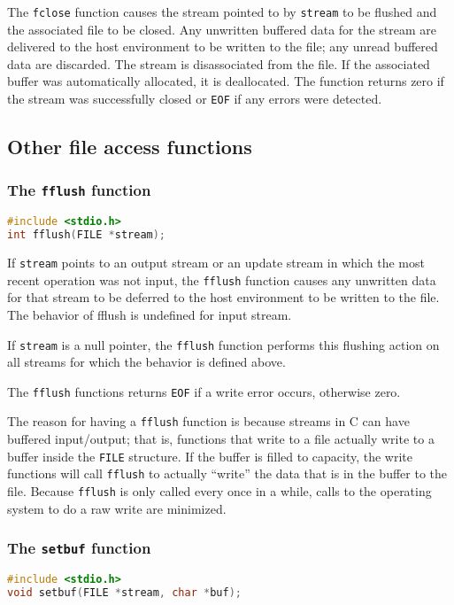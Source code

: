 The \texttt{fclose} function causes the stream pointed to by \texttt{stream} to
be flushed and the associated file to be closed. Any unwritten buffered data
for the stream are delivered to the host environment to be written to the file;
any unread buffered data are discarded. The stream is disassociated from the
file. If the associated buffer was automatically allocated, it is deallocated.
The function returns zero if the stream was successfully closed or \texttt{EOF}
if any errors were detected.

\subsection{Other file access functions}
\subsubsection{The \texttt{fflush} function}
\lstset{basicstyle=\scriptsize, numbers=left, captionpos=b, tabsize=4}
\begin{lstlisting}[caption=Section \thesection listing \arabic{filecnt},language={C},
breaklines=true,xleftmargin=15pt,label=lst:section\thesection listing\arabic{filecnt}]
#include <stdio.h>
int fflush(FILE *stream);
\end{lstlisting}

If \texttt{stream} points to an output stream or an update stream in which the
most recent operation was not input, the \texttt{fflush} function causes any
unwritten data for that stream to be deferred to the host environment to be
written to the file. The behavior of fflush is undefined for input stream.

If \texttt{stream} is a null pointer, the \texttt{fflush} function performs
this flushing action on all streams for which the behavior is defined above.

The \texttt{fflush} functions returns \texttt{EOF} if a write error occurs,
otherwise zero.

The reason for having a \texttt{fflush} function is because streams in C can
have buffered input/output; that is, functions that write to a file actually
write to a buffer inside the \texttt{FILE} structure. If the buffer is filled
to capacity, the write functions will call \texttt{fflush} to actually
``write'' the data that is in the buffer to the file. Because \texttt{fflush}
is only called every once in a while, calls to the operating system to do a raw
write are minimized.

\subsubsection{The \texttt{setbuf} function}
\lstset{basicstyle=\scriptsize, numbers=left, captionpos=b, tabsize=4}
\begin{lstlisting}[caption=Section \thesection listing \arabic{filecnt},language={C},
breaklines=true,xleftmargin=15pt,label=lst:section\thesection listing\arabic{filecnt}]
#include <stdio.h>
void setbuf(FILE *stream, char *buf);
\end{lstlisting}

